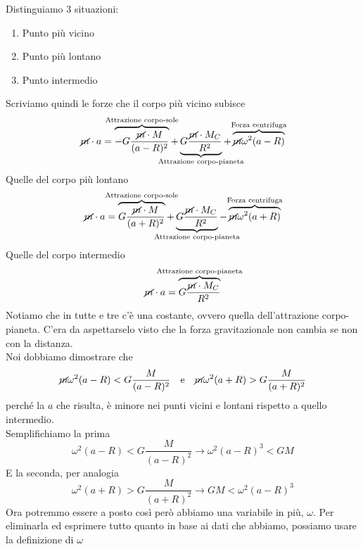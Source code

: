 Distinguiamo 3 situazioni:
\begin{enumerate}
	\item Punto più vicino
	\item Punto più lontano
	\item Punto intermedio
\end{enumerate}
Scriviamo quindi le forze che il corpo più vicino subisce
\begin{equation*}
\cancel{m}\cdot a = 
\overbrace{-G\frac{\cancel{m}\cdot M}{(a-R)^2}}^{\mathclap{\text{Attrazione corpo-sole}}}+
\underbrace{G\frac{\cancel{m}\cdot M_C}{R^2}}_{\mathclap{\text{Attrazione corpo-pianeta}}}+
\overbrace{\cancel{m}\omega^2(a-R)}^{\mathclap{\text{Forza centrifuga}}}
\end{equation*}
Quelle del corpo più lontano
\begin{equation*}
\cancel{m}\cdot a = 
\overbrace{G\frac{\cancel{m}\cdot M}{(a+R)^2}}^{\mathclap{\text{Attrazione corpo-sole}}}+
\underbrace{G\frac{\cancel{m}\cdot M_C}{R^2}}_{\mathclap{\text{Attrazione corpo-pianeta}}}-
\overbrace{\cancel{m}\omega^2(a+R)}^{\mathclap{\text{Forza centrifuga}}}
\end{equation*}
Quelle del corpo intermedio
\begin{equation*}
\cancel{m}\cdot a =
\overbrace{G\frac{\cancel{m}\cdot M_C}{R^2}}^{\mathclap{\text{Attrazione corpo-pianeta}}}
\end{equation*}
Notiamo che in tutte e tre c'è una costante, ovvero quella dell'attrazione corpo-pianeta. C'era da
aspettarselo visto che la forza gravitazionale non cambia se non con la distanza.\\
Noi dobbiamo dimostrare che
\begin{equation*}
\cancel{m}\omega^2(a-R)<G\frac{M}{(a-R)^2}\quad\text{e}\quad\cancel{m}\omega^2(a+R)>G\frac{M}{(a+R)^2}
\end{equation*}
perché la $a$ che risulta, è minore nei punti vicini e lontani rispetto a quello intermedio.\\
Semplifichiamo la prima
\begin{equation*}
\omega^2(a-R)<G\frac{M}{(a-R)^2} \rightarrow \omega^2(a-R)^3<GM
\end{equation*}
E la seconda, per analogia
\begin{equation*}
\omega^2(a+R)>G\frac{M}{(a+R)^2} \rightarrow GM<\omega^2(a-R)^3
\end{equation*}
Ora potremmo essere a posto così però abbiamo una variabile in più, $\omega$. Per eliminarla ed
esprimere tutto quanto in base ai dati che abbiamo, possiamo usare la definizione di $\omega$
